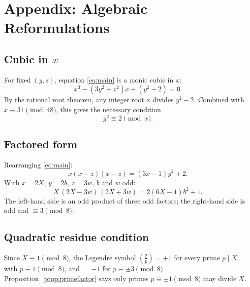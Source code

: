 \documentclass[12pt,a4paper]{article}
\begin{document}
\section{Appendix: Algebraic Reformulations}
\label{sec:appendix}

\subsection{Cubic in $x$}

For fixed $(y,z)$, equation \eqref{eq:main} is a monic cubic in $x$:
\begin{equation}\label{eq:cubic_x}
  x^3 - (3y^2+z^2)x + (y^2-2) = 0.
\end{equation}
By the rational root theorem, any integer root $x$ divides $y^2-2$. Combined
with $x \equiv 34 \pmod{48}$, this gives the necessary condition
\[
  y^2 \equiv 2 \pmod{x}.
\]

\subsection{Factored form}

Rearranging \eqref{eq:main}:
\[
  x(x-z)(x+z) = (3x-1)y^2 + 2.
\]
With $x=2X$, $y=2b$, $z=3w$, $b$ and $w$ odd:
\[
  X\,(2X-3w)\,(2X+3w) = 2(6X-1)b^2 + 1. \tag{$\star$}
\]
The left-hand side is an odd product of three odd factors; the right-hand
side is odd and $\equiv 3 \pmod 8$.

\subsection{Quadratic residue condition}

Since $X \equiv 1 \pmod 8$, the Legendre symbol $\left(\tfrac{2}{p}\right) =
+1$ for every prime $p \mid X$ with $p \equiv 1 \pmod 8$, and $= -1$ for $p
\equiv \pm3 \pmod 8$. Proposition~\ref{prop:primefactor} says only primes
$p \equiv \pm1 \pmod 8$ may divide $X$.
\end{document}
